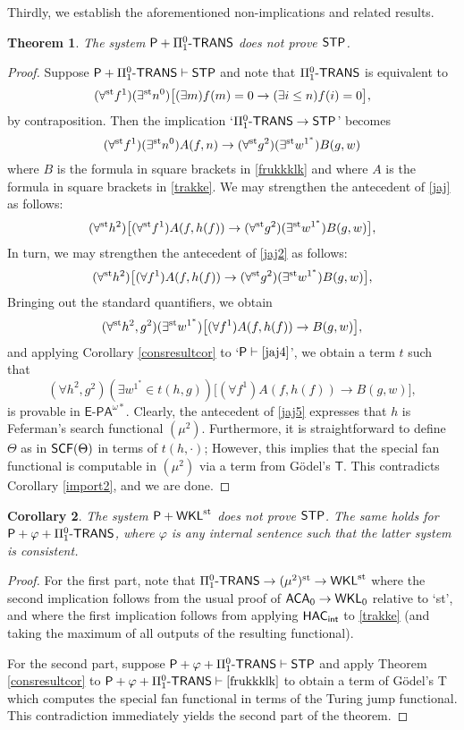 \documentclass[reqno]{amsart}
\newtheorem{thm}{Theorem}
\newtheorem{cor}[thm]{Corollary}
\newcommand\be{\begin{equation}}
\newcommand\ee{\end{equation}}
\def\STP{\textup{\textsf{STP}}}
\def\WKL{\textup{\textsf{WKL}}}
\def\P{\textup{\textsf{P}}}
\def\st{\textup{st}}
\def\di{\rightarrow}
\def\ACA{\textup{\textsf{ACA}}}
\def\paai{\Pi_{1}^{0}\textup{-\textsf{TRANS}}}
\def\SCF{\textup{\textsf{SCF}}}
\def\HAC{\textup{\textsf{HAC}}}
\def\INT{\textup{\textsf{int}}}
\numberwithin{equation}{section}
\numberwithin{thm}{section}
\begin{document}
Thirdly, we establish the aforementioned non-implications and related results. 
\begin{thm}\label{nogwel}
The system $\P+\paai$ does not prove $\STP$.  
\end{thm}
\begin{proof}
Suppose $\P+\paai\vdash \STP$ and note that $\paai$ is equivalent to 
\be\label{trakke}
(\forall^{\st}f^{1})(\exists^{\st}n^{0})\big[ (\exists m)f(m)=0 \di (\exists i\leq n)f(i)=0  \big],
\ee
by contraposition.  Then the implication `$\paai\di \STP$' becomes
\be\label{jaj}
(\forall^{\st}f^{1})(\exists^{\st}n^{0})A(f,n)\di (\forall^{\st}g^{2})(\exists^{\st}w^{1^{*}})B(g,w)
\ee
where $B$ is the formula in square brackets in \eqref{frukkklk} and where $A$ is the formula in square brackets in \eqref{trakke}.  
We may strengthen the antecedent of \eqref{jaj} as follows:
\be\label{jaj2}
(\forall^{\st} h^{2})\big[(\forall^{\st}f^{1})A(f,h(f))\di (\forall^{\st}g^{2})(\exists^{\st}w^{1^{*}})B(g,w)\big], 
\ee  
In turn, we may strengthen the antecedent of \eqref{jaj2} as follows:
\be\label{jaj3}
(\forall^{\st} h^{2})\big[(\forall f^{1})A(f,h(f))\di (\forall^{\st}g^{2})(\exists^{\st}w^{1^{*}})B(g,w)\big], 
\ee  
Bringing out the standard quantifiers, we obtain
\be\label{jaj4}
(\forall^{\st} h^{2}, g^{2})(\exists^{\st}w^{1^{*}})\big[(\forall f^{1})A(f,h(f))\di B(g,w)\big], 
\ee  
and applying Corollary \ref{consresultcor} to `$\P\vdash \eqref{jaj4}$', we obtain a term $t$ such that         
\be\label{jaj5}
(\forall h^{2}, g^{2})(\exists w^{1^{*}}\in t(h,g))\big[(\forall f^{1})A(f,h(f))\di B(g,w)\big], 
\ee  
is provable in $\textsf{E-PA}^{\omega*}$.  Clearly, the antecedent of \eqref{jaj5} expresses that $h$ is Feferman's search functional $(\mu^{2})$.  
Furthermore, it is straightforward to define $\Theta$ as in $\SCF(\Theta)$ in terms of $t(h,\cdot)$;  However, this implies that the special fan functional is computable in $(\mu^{2})$ via a term from G\"odel's $\textsf{T}$.  This contradicts Corollary \ref{import2}, and we are done.   
\end{proof}
\begin{cor}\label{nogwel2}
The system $\P+\WKL^{\st}$ does not prove $\STP$.  The same holds for $\P+\varphi+\paai$, where $\varphi$ is any internal sentence such that the latter system is consistent.  
\end{cor}
\begin{proof}
For the first part, note that $\paai\di (\mu^{2})^{\st}\di \WKL^{\st}$ where the second implication follows from the usual proof of $\ACA_{0}\di \WKL_{0}$ relative to `st', and where the first implication 
follows from applying $\HAC_{\INT}$ to \eqref{trakke} (and taking the maximum of all outputs of the resulting functional).  
  
\medskip  
  
For the second part, suppose $\P+\varphi+\paai\vdash \STP$ and apply Theorem \ref{consresultcor} to $\P+\varphi+\paai\vdash \eqref{frukkklk}$ to obtain a term of G\"odel's \textsf{T} which computes the special fan functional in terms of the Turing jump functional.  This contradiction immediately yields the second part of the theorem.      
\end{proof}
\end{document}
